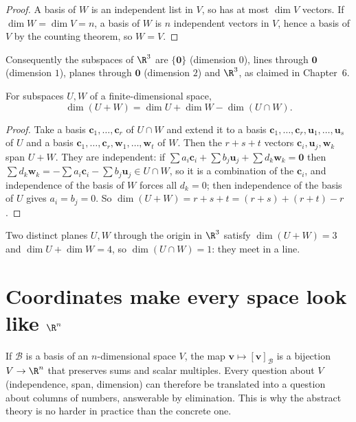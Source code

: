 \begin{proof}
A basis of $W$ is an independent list in $V$, so has at most $\dim V$ vectors. If $\dim W=\dim V=n$, a basis of $W$ is $n$ independent vectors in $V$, hence a basis of $V$ by the counting theorem, so $W=V$.
\end{proof}

Consequently the subspaces of $\R^3$ are $\{\mathbf{0}\}$ (dimension $0$), lines through $\mathbf{0}$ (dimension $1$), planes through $\mathbf{0}$ (dimension $2$) and $\R^3$, as claimed in Chapter~6.

\begin{theorem}\label{thm:dimsum}
For subspaces $U,W$ of a finite-dimensional space,
\[ \dim(U+W)=\dim U+\dim W-\dim(U\cap W). \]
\end{theorem}

\begin{proof}
Take a basis $\mathbf{c}_1,\dots,\mathbf{c}_r$ of $U\cap W$ and extend it to a basis $\mathbf{c}_1,\dots,\mathbf{c}_r,\mathbf{u}_1,\dots,\mathbf{u}_s$ of $U$ and a basis $\mathbf{c}_1,\dots,\mathbf{c}_r,\mathbf{w}_1,\dots,\mathbf{w}_t$ of $W$. Then the $r+s+t$ vectors $\mathbf{c}_i,\mathbf{u}_j,\mathbf{w}_k$ span $U+W$. They are independent: if $\sum a_i\mathbf{c}_i+\sum b_j\mathbf{u}_j+\sum d_k\mathbf{w}_k=\mathbf{0}$ then $\sum d_k\mathbf{w}_k=-\sum a_i\mathbf{c}_i-\sum b_j\mathbf{u}_j\in U\cap W$, so it is a combination of the $\mathbf{c}_i$, and independence of the basis of $W$ forces all $d_k=0$; then independence of the basis of $U$ gives $a_i=b_j=0$. So $\dim(U+W)=r+s+t=(r+s)+(r+t)-r$.
\end{proof}

\begin{example}
Two distinct planes $U,W$ through the origin in $\R^3$ satisfy $\dim(U+W)=3$ and $\dim U+\dim W=4$, so $\dim(U\cap W)=1$: they meet in a line.
\end{example}

\section{Coordinates make every space look like $\R^n$}

If $\mathcal{B}$ is a basis of an $n$-dimensional space $V$, the map $\mathbf{v}\mapsto[\mathbf{v}]_{\mathcal{B}}$ is a bijection $V\to\R^n$ that preserves sums and scalar multiples. Every question about $V$ (independence, span, dimension) can therefore be translated into a question about columns of numbers, answerable by elimination. This is why the abstract theory is no harder in practice than the concrete one.

